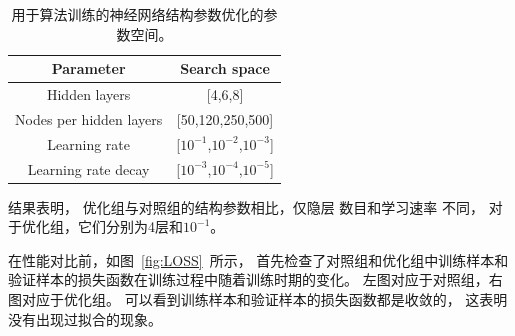 \begin{table}[ht]
\caption{用于算法训练的神经网络结构参数优化的参数空间。}
\begin{center}
\begin{tabular}{c|c}
    \hline
    \hline
    Parameter & Search space  \\
    \hline  
    Hidden layers & [4,6,8] \\
    \hline  
    Nodes per hidden layers & [50,120,250,500] \\
    \hline  
    Learning rate & [$10^{-1}$,$10^{-2}$,$10^{-3}$]\\
    \hline  
    Learning rate decay & [$10^{-3}$,$10^{-4}$,$10^{-5}$] \\
    \hline
    \hline
\end{tabular}
\end{center}
\label{tab:Space}
\end{table}

结果表明，
优化组与对照组的结构参数相比，仅隐层
数目和学习速率
不同，
对于优化组，它们分别为4层和$10^{-1}$。

在性能对比前，如图~\ref{fig:LOSS}~所示，
首先检查了对照组和优化组中训练样本和验证样本的损失函数在训练过程中随着训练时期的变化。
左图对应于对照组，右图对应于优化组。
可以看到训练样本和验证样本的损失函数都是收敛的，
这表明没有出现过拟合的现象。

